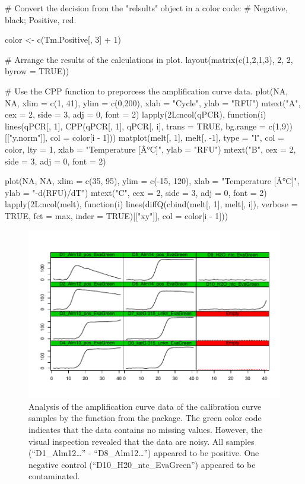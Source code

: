 \begin{example}
# Convert the decision from the "relsults" object in a color code:
# Negative, black; Positive, red.

color <- c(Tm.Positive[, 3] + 1)

# Arrange the results of the calculations in plot.
layout(matrix(c(1,2,1,3), 2, 2, byrow = TRUE))

# Use the CPP function to preporcess the amplification curve data.
plot(NA, NA, xlim = c(1, 41), ylim = c(0,200), xlab = "Cycle", ylab = "RFU")
mtext("A", cex = 2, side = 3, adj = 0, font = 2)
lapply(2L:ncol(qPCR), function(i) 
  lines(qPCR[, 1], 
        CPP(qPCR[, 1], qPCR[, i], trans = TRUE, 
            bg.range = c(1,9))[["y.norm"]],
        col = color[i - 1]))
matplot(melt[, 1], melt[, -1], type = "l", col = color, 
	lty = 1, xlab = "Temperature [Â°C]", ylab = "RFU")
mtext("B", cex = 2, side = 3, adj = 0, font = 2)
	
plot(NA, NA, xlim = c(35, 95), ylim = c(-15, 120), xlab = "Temperature [Â°C]", 
     ylab = "-d(RFU)/dT")
mtext("C", cex = 2, side = 3, adj = 0, font = 2)
lapply(2L:ncol(melt), function(i)
  lines(diffQ(cbind(melt[, 1], melt[, i]), verbose = TRUE, 
              fct = max, inder = TRUE)[["xy"]], col = color[i - 1]))
              
\end{example}


\begin{figure}[htbp]
  \centering
  \includegraphics{figures/plotCurves.pdf}
  \caption{Analysis of the amplification curve data of the calibration curve 
samples by the  function from the  package. 
The green color code indicates that the data contains no missing values. 
However, the visual inspection revealed that the data are noisy. All samples 
(``D1\_Alm12\ldots'' - ``D8\_Alm12\ldots'') appeared to be positive. One 
negative control (``D10\_H20\_ntc\_EvaGreen'') appeared to be contaminated.}
  \label{figure:plotCurves}
\end{figure}


